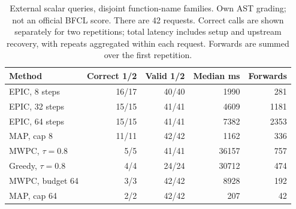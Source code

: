 \begin{table}[ht]
\centering\small
\caption{External scalar queries, disjoint function-name families. Own AST grading; not an official BFCL score. There are 42 requests. Correct calls are shown separately for two repetitions; total latency includes setup and upstream recovery, with repeats aggregated within each request. Forwards are summed over the first repetition.}
\label{tab:live-grounded}
\begin{tabular}{lrrrr}
\toprule
Method & Correct 1/2 & Valid 1/2 & Median ms & Forwards \\
\midrule
EPIC, 8 steps & 16/17 & 40/40 & 1990 & 281 \\
EPIC, 32 steps & 15/15 & 41/41 & 4609 & 1181 \\
EPIC, 64 steps & 15/15 & 41/41 & 7382 & 2353 \\
MAP, cap 8 & 11/11 & 42/42 & 1162 & 336 \\
MWPC, $\tau=0.8$ & 5/5 & 41/41 & 36157 & 757 \\
Greedy, $\tau=0.8$ & 4/4 & 24/24 & 30712 & 474 \\
MWPC, budget 64 & 3/3 & 42/42 & 8928 & 192 \\
MAP, cap 64 & 2/2 & 42/42 & 207 & 42 \\
\bottomrule
\end{tabular}
\end{table}
